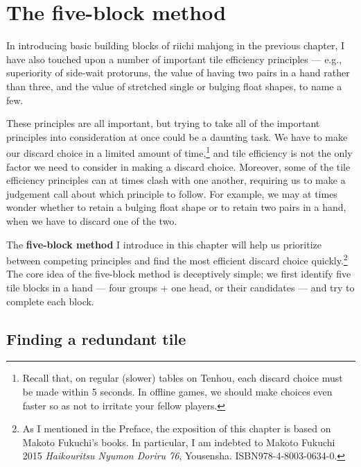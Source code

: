 
\chapter{The five-block method} \label{ch:five}
\thispagestyle{empty}

In introducing basic building blocks of riichi mahjong in the previous chapter, I have also touched upon a number of important tile efficiency principles ---
e.g., superiority of side-wait protoruns, the value of having two pairs in a hand rather than three, and the value of stretched single or bulging float shapes, to name a few.

\bigskip
These principles are all important, but trying to take all of the important principles into consideration at once could be a daunting task. We have to make our discard choice in a limited amount of time,\footnote{Recall that, on regular (slower) tables on {\jap Tenhou}, each discard choice must be made within 5 seconds. In offline games, we should make choices even faster so as not to irritate your fellow players.} and tile efficiency is not the only factor we need to consider in making a discard choice.
Moreover, some of the tile efficiency principles can at times clash with one another, requiring us to make a judgement call about which principle to follow. For example, we may at times wonder whether to retain a bulging float shape or to retain two pairs in a hand, when we have to discard one of the two.

\bigskip
The {\bf five-block method} I introduce in this chapter will help us prioritize between competing principles and find the most efficient discard choice quickly.\footnote{As I mentioned in the Preface, the exposition of this chapter is based on Makoto Fukuchi's books. In particular, I am indebted to Makoto Fukuchi 2015 \textit{Haikouritsu Nyumon Doriru 76}, Yousensha. ISBN978-4-8003-0634-0.}
The core idea of the five-block method is deceptively simple; we first identify five tile blocks in a hand --- four groups + one head, or their candidates --- and try to complete each block.

\section{Finding a redundant tile}

